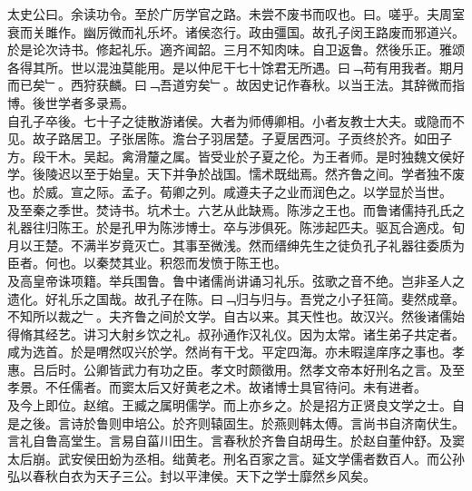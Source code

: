 \documentclass{zhvt-classic}
\begin{document}

\hspace*{2em}太史公曰。余读功令。至於广厉学官之路。未尝不废书而叹也。曰。嗟乎。夫周室衰而关雎作。幽厉微而礼乐坏。诸侯恣行。政由彊国。故孔子闵王路废而邪道兴。於是论次诗书。修起礼乐。適齐闻韶。三月不知肉味。自卫返鲁。然後乐正。雅颂各得其所。世以混浊莫能用。是以仲尼干七十馀君无所遇。曰﹁苟有用我者。期月而已矣﹂。西狩获麟。曰﹁吾道穷矣﹂。故因史记作春秋。以当王法。其辞微而指博。後世学者多录焉。\\
\hspace*{2em}自孔子卒後。七十子之徒散游诸侯。大者为师傅卿相。小者友教士大夫。或隐而不见。故子路居卫。子张居陈。澹台子羽居楚。子夏居西河。子贡终於齐。如田子方。段干木。吴起。禽滑釐之属。皆受业於子夏之伦。为王者师。是时独魏文侯好学。後陵迟以至于始皇。天下并争於战国。懦术既绌焉。然齐鲁之间。学者独不废也。於威。宣之际。孟子。荀卿之列。咸遵夫子之业而润色之。以学显於当世。\\
\hspace*{2em}及至秦之季世。焚诗书。坑术士。六艺从此缺焉。陈涉之王也。而鲁诸儒持孔氏之礼器往归陈王。於是孔甲为陈涉博士。卒与涉俱死。陈涉起匹夫。驱瓦合適戍。旬月以王楚。不满半岁竟灭亡。其事至微浅。然而缙绅先生之徒负孔子礼器往委质为臣者。何也。以秦焚其业。积怨而发愤于陈王也。\\
\hspace*{2em}及高皇帝诛项籍。举兵围鲁。鲁中诸儒尚讲诵习礼乐。弦歌之音不绝。岂非圣人之遗化。好礼乐之国哉。故孔子在陈。曰﹁归与归与。吾党之小子狂简。斐然成章。不知所以裁之﹂。夫齐鲁之间於文学。自古以来。其天性也。故汉兴。然後诸儒始得脩其经艺。讲习大射乡饮之礼。叔孙通作汉礼仪。因为太常。诸生弟子共定者。咸为选首。於是喟然叹兴於学。然尚有干戈。平定四海。亦未暇遑庠序之事也。孝惠。吕后时。公卿皆武力有功之臣。孝文时颇徵用。然孝文帝本好刑名之言。及至孝景。不任儒者。而窦太后又好黄老之术。故诸博士具官待问。未有进者。\\
\hspace*{2em}及今上即位。赵绾。王臧之属明儒学。而上亦乡之。於是招方正贤良文学之士。自是之後。言诗於鲁则申培公。於齐则辕固生。於燕则韩太傅。言尚书自济南伏生。言礼自鲁高堂生。言易自菑川田生。言春秋於齐鲁自胡毋生。於赵自董仲舒。及窦太后崩。武安侯田蚡为丞相。绌黄老。刑名百家之言。延文学儒者数百人。而公孙弘以春秋白衣为天子三公。封以平津侯。天下之学士靡然乡风矣。\\
\end{document}
